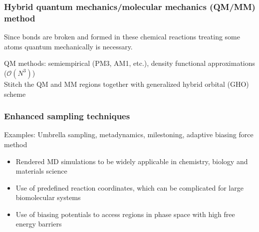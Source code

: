 \documentclass{beamer}
\begin{document}
\begin{frame}
\frametitle{Hybrid quantum mechanics/molecular mechanics (QM/MM) method}
Since bonds are broken and formed in these chemical reactions treating some atoms 
quantum mechanically is necessary.
\begin{center}
\end{center}
QM methods: semiempirical (PM3, AM1, etc.), density functional approximations ($\mathcal{O}(N^3)$) \\
Stitch the QM and MM regions together with generalized hybrid orbital (GHO) scheme 
\end{frame}
\begin{frame}
\frametitle{Enhanced sampling techniques}
\pause
Examples: Umbrella sampling, metadynamics, milestoning, adaptive biasing force method
\pause
\begin{block}
{
    \begin{itemize}
        \item Rendered MD simulations to be widely applicable in chemistry, biology and materials science
        \pause
        \item Use of predefined reaction coordinates, which can be complicated for large biomolecular systems
        \pause
        \item Use of biasing potentials to access regions in phase space with high free energy barriers
    \end{itemize}
}
\end{block}
\end{frame}
\end{document}
